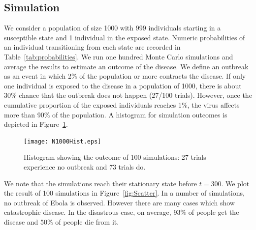 \subsection{Simulation}
We consider a population of size 1000 with 999 individuals starting in a susceptible state and 1 individual in the exposed state. Numeric probabilities of an individual transitioning from each state are recorded in Table~\ref{tab:probabilities}. We run one hundred Monte Carlo simulations and average the results to estimate an outcome of the disease. We define an outbreak as an event in which 2\% of the population or more contracts the disease. If only one individual is exposed to the disease in a population of 1000, there is about 30\% chance that the outbreak does not happen (27/100 trials). However, once the cumulative proportion of the exposed individuals reaches 1\%, the virus affects more than 90\% of the population. A histogram for simulation outcomes is depicted in Figure~\ref{fig:Hist}.
%
%
%
%
%
%
\begin{figure}[h!]
\begin{center}
\texttt{[image: N1000Hist.eps]}
\end{center}
\caption{Histogram showing the outcome of 100 simulations: 27 trials experience no outbreak and 73 trials do.}
\label{fig:Hist}
\end{figure}


We note that the simulations reach their stationary state before $t = 300$. We plot the result of 100 simulations in Figure~\ref{fig:Scatter}. In a number of simulations, no outbreak of Ebola is observed. However there are many cases which show catastrophic disease. In the disastrous case, on average, 93\% of people get the disease and 50\% of people die from it. 

 
